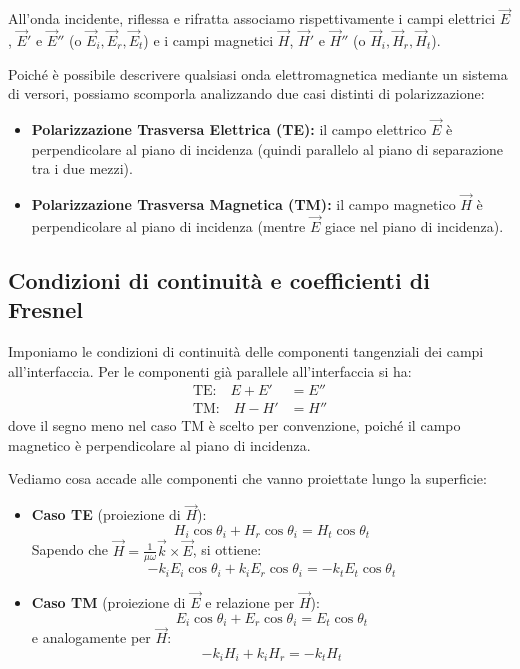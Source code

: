 \documentclass[openany,a4paper,12pt]{book}
\begin{document}
All'onda incidente, riflessa e rifratta associamo rispettivamente i campi elettrici $\vec{E}$, $\vec{E}'$ e $\vec{E}''$ (o $\vec{E}_i, \vec{E}_r, \vec{E}_t$) e i campi magnetici $\vec{H}$, $\vec{H}'$ e $\vec{H}''$ (o $\vec{H}_i, \vec{H}_r, \vec{H}_t$).

Poiché è possibile descrivere qualsiasi onda elettromagnetica mediante un sistema di versori, possiamo scomporla analizzando due casi distinti di polarizzazione:
\begin{itemize}
    \item \textbf{Polarizzazione Trasversa Elettrica (TE):} il campo elettrico $\vec{E}$ è perpendicolare al piano di incidenza (quindi parallelo al piano di separazione tra i due mezzi).
    \item \textbf{Polarizzazione Trasversa Magnetica (TM):} il campo magnetico $\vec{H}$ è perpendicolare al piano di incidenza (mentre $\vec{E}$ giace nel piano di incidenza).
\end{itemize}

\subsection*{Condizioni di continuità e coefficienti di Fresnel}

Imponiamo le condizioni di continuità delle componenti tangenziali dei campi all'interfaccia. Per le componenti già parallele all'interfaccia si ha:
\begin{align*}
    \text{TE:} \quad E + E' &= E'' \\
    \text{TM:} \quad H - H' &= H''
\end{align*}
dove il segno meno nel caso TM è scelto per convenzione, poiché il campo magnetico è perpendicolare al piano di incidenza.

Vediamo cosa accade alle componenti che vanno proiettate lungo la superficie:
\begin{itemize}
    \item \textbf{Caso TE} (proiezione di $\vec{H}$):
    \[
        H_i \cos\theta_i + H_r \cos\theta_i = H_t \cos\theta_t
    \]
    Sapendo che $\vec{H} = \frac{1}{\mu \omega} \vec{k} \times \vec{E}$, si ottiene:
    \[
        -k_i E_i \cos\theta_i + k_i E_r \cos\theta_i = -k_t E_t \cos\theta_t
    \]
    \item \textbf{Caso TM} (proiezione di $\vec{E}$ e relazione per $\vec{H}$):
    \[
        E_i \cos\theta_i + E_r \cos\theta_i = E_t \cos\theta_t
    \]
    e analogamente per $\vec{H}$:
    \[
        -k_i H_i + k_i H_r = -k_t H_t
    \]
\end{itemize}
\end{document}
